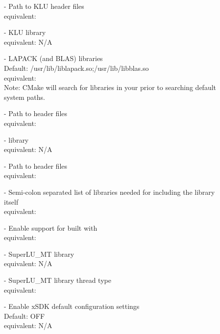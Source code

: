 \begin{description}
\item[] -
  Path to KLU header files
  \\
  {\sundials} equivalent: 
\item[] -
  KLU library
  \\
  {\sundials} equivalent: N/A
\item[] -
  LAPACK (and BLAS) libraries
  \\
  Default: /usr/lib/liblapack.so;/usr/lib/libblas.so
  \\
  {\sundials} equivalent: 
  \\
  Note: CMake will search for libraries in your  prior
  to searching default system paths.
\item[] -
  Path to {\petsc} header files
  \\
  {\sundials} equivalent: 
\item[] -
  {\petsc} library
  \\
  {\sundials} equivalent: N/A
\item[] -
  Path to {\superludist} header files
  \\
  {\sundials} equivalent: 
\item[] -
  Semi-colon separated list of libraries needed for {\superludist}
  including the {\superludist} library itself
  \\
  {\sundials} equivalent: 
\item[] -
  Enable {\sundials} support for {\superludist} built with {\openmp}
  \\
  {\sundials} equivalent: 
\item[] -
  SuperLU\_MT library
  \\
  {\sundials} equivalent: N/A
\item[] -
  SuperLU\_MT library thread type
  \\
  {\sundials} equivalent: 
\item[] -
  Enable xSDK default configuration settings
  \\
  Default: OFF
  \\
  {\sundials} equivalent: N/A

\end{description}
